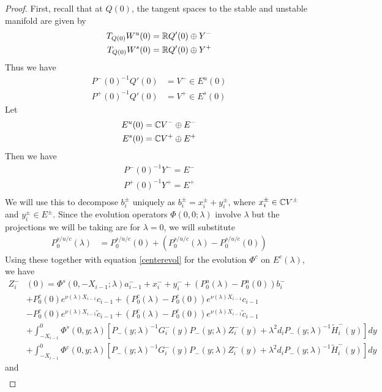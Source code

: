 \documentclass[thesis.tex]{subfiles}
\begin{document}
\begin{lemma}
\begin{proof}
First, recall that at $Q(0)$, the tangent spaces to the stable and unstable manifold are given by
\begin{align*}
T_{Q(0)} W^u(0) &= \mathbb{R} Q'(0) \oplus Y^- \\
T_{Q(0)} W^s(0) &= \mathbb{R} Q'(0) \oplus Y^+
\end{align*}
Thus we have
\begin{align*}
P^-(0)^{-1} Q'(0) &= V^- \in E^u(0) \\
P^+(0)^{-1} Q'(0) &= V^+ \in E^s(0)
\end{align*}
Let
\begin{align*}
E^u(0) &= \mathbb{C} V^- \oplus E^- \\
E^s(0) &= \mathbb{C} V^+ \oplus E^+ \\
\end{align*}
Then we have
\begin{align*}
P^-(0)^{-1} Y^- = E^- \\
P^+(0)^{-1} Y^+ = E^+ \\
\end{align*}
We will use this to decompose $b_i^\pm$ uniquely as $b_i^\pm = x_i^\pm + y_i^\pm$, where $x_i^\pm \in \mathbb{C} V^\pm$ and $y_i^\pm \in E^\pm$. Since the evolution operators $\Phi(0, 0; \lambda)$ involve $\lambda$ but the projections we will be taking are for $\lambda = 0$, we will substitute
\begin{align*}
P_0^{s/u/c}(\lambda) &= P_0^{s/u/c}(0) + (P_0^{s/u/c}(\lambda) - P_0^{s/u/c}(0)) 
\end{align*}
Using these together with equation \eqref{centerevol} for the evolution $\Phi^c$ on $E^c(\lambda)$, we have
\begin{align*}
Z_i^-&(0) = \Phi^s(0, -X_{i-1}; \lambda) a_{i-1}^- + x_i^- + y_i^- + (P_0^u(\lambda) - P_0^u(0))b_i^- \\
&+ P_0^c(0) e^{\nu(\lambda) X_{i-1}} c_{i-1} + (P_0^c(\lambda) - P_0^c(0)) e^{\nu(\lambda) X_{i-1}} c_{i-1} \\
&- P_0^c(0) e^{\nu(\lambda) X_{i-1}} \tilde{c}_{i-1} + (P_0^c(\lambda) - P_0^c(0)) e^{\nu(\lambda) X_{i-1}} \tilde{c}_{i-1} \\
&+ \int_{-X_{i-1}}^0 \Phi^s(0, y; \lambda) [P_-(y; \lambda)^{-1} G_i^-(y) P_-(y; \lambda)Z_i^-(y) + \lambda^2 d_i P_-(y; \lambda)^{-1} \tilde{H}_i^-(y)] dy \\
&+ \int_{-X_{i-1}}^0 \Phi^c(0, y; \lambda) [P_-(y; \lambda)^{-1} G_i^-(y) P_-(y; \lambda)Z_i^-(y) + \lambda^2 d_i P_-(y; \lambda)^{-1} \tilde{H}_i^-(y)] dy 
\end{align*}
and
\begin{align*} 

\end{align*}
\end{proof}
\end{lemma}
\end{document}
